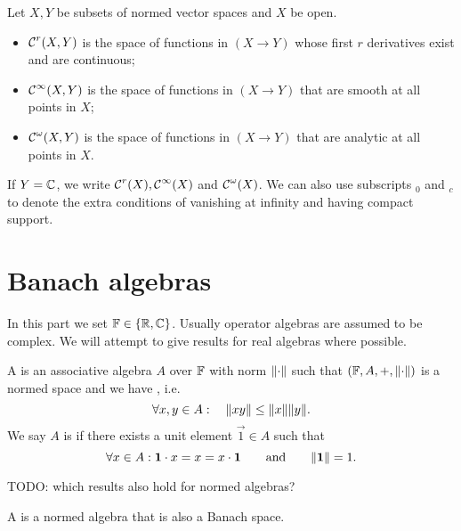 \begin{definition}
Let $X,Y$ be subsets of normed vector spaces and $X$ be open.
\begin{itemize}
\item $\operatorname{\mathcal{C}}^r(X,Y)$ is the space of functions in $(X \to Y)$ whose first $r$ derivatives exist and are continuous;
\item $\operatorname{\mathcal{C}}^\infty(X,Y)$ is the space of functions in $(X \to Y)$ that are smooth at all points in $X$;
\item $\operatorname{\mathcal{C}}^\omega(X,Y)$ is the space of functions in $(X \to Y)$ that are analytic at all points in $X$.
\end{itemize}
If $Y = \mathbb{C}$, we write $\operatorname{\mathcal{C}}^r(X), \operatorname{\mathcal{C}}^\infty(X)$ and $\operatorname{\mathcal{C}}^\omega(X)$. We can also use subscripts $_0$ and $_c$ to denote the extra conditions of vanishing at infinity and having compact support.
\end{definition}







\chapter{Banach algebras}
In this part we set $\mathbb{F} \in \{\mathbb{R}, \mathbb{C}\}$. Usually operator algebras are assumed to be complex. We will attempt to give results for real algebras where possible.
\begin{definition}
A  is an associative algebra $A$ over $\mathbb{F}$ with norm $\lVert\cdot\rVert$ such that $(\mathbb{F}, A,+, \lVert\cdot\rVert)$ is a normed space and we have , i.e.
\[ \forall x,y\in A: \quad \lVert xy\rVert\leq\lVert x\rVert\lVert y\rVert. \]
We say $A$ is  if there exists a unit element $\vec{1}\in A$ such that
\[ \forall x\in A: \boldsymbol{\mathrm{1}}\cdot x = x = x\cdot \boldsymbol{\mathrm{1}} \qquad \text{and} \qquad \lVert\boldsymbol{\mathrm{1}}\rVert = 1. \]
\end{definition}
TODO: which results also hold for normed algebras?
\begin{definition}
A  is a normed algebra that is also a Banach space.
\end{definition}

